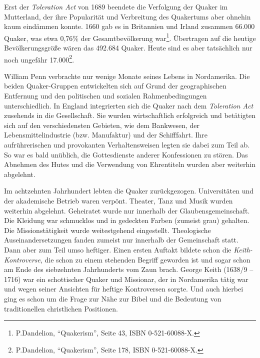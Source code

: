 \medskip

Erst der \textit{Toleration Act} von 1689 beendete die
Verfolgung der Quaker im
Mutterland, der ihre Popularität und Verbreitung des Quakertums aber ohnehin
kaum eindämmen konnte.
 1660 gab
es in Britannien und Irland
zusammen
66.000 Quaker, was etwa 0,76\% der
Gesamtbevölkerung war\footnote{P.Dandelion, "`Quakerism"', Seite 43, ISBN
0-521-60088-X.}. Übertragen auf die heutige Bevölkerungsgröße wären das 492.684
Quaker. Heute sind es aber tatsächlich nur noch ungefähr
17.000\footnote{P.Dandelion, "`Quakerism"', Seite 178, ISBN 0-521-60088-X.}.

\medskip

William Penn verbrachte nur wenige Monate seines Lebens in Nordamerika. Die beiden
Quaker-Gruppen entwickelten sich auf Grund der geographischen Entfernung und den
politischen und sozialen Rahmenbedingungen unterschiedlich. In
England integrierten sich die Quaker nach dem \textit{Toleration Act} zusehends
in die Gesellschaft. Sie wurden wirtschaftlich
erfolgreich und betätigten sich
auf den verschiedensten Gebieten, wie dem Bankwesen, der
Lebensmittelindustrie
(bzw. Manufaktur) und der Schifffahrt. Ihre aufrührerischen und provokanten
Verhaltensweisen legten sie dabei zum Teil ab. So war es bald unüblich, die
Gottesdienste anderer Konfessionen
 zu stören. Das Abnehmen des Hutes und die
Verwendung von Ehrentiteln wurden aber weiterhin abgelehnt.

\medskip

Im achtzehnten Jahrhundert lebten die Quaker zurückgezogen.
Universitäten und der akademische Betrieb waren verpönt.
 Theater, Tanz und Musik
wurden weiterhin abgelehnt. Geheiratet wurde nur innerhalb der
Glaubensgemeinschaft. Die Kleidung war schmucklos und in
gedeckten Farben
(zumeist grau) gehalten. Die Missionstätigkeit wurde weitestgehend eingestellt.
Theologische Auseinandersetzungen fanden zumeist nur innerhalb der Gemeinschaft
statt. Dann aber zum Teil umso heftiger. Einen ersten Auftakt bildete schon die
\textit{Keith-Kontroverse}, die schon zu einem
stehenden Begriff geworden ist und sogar schon am Ende des siebzehnten Jahrhunderts
vom Zaun brach. George Keith (1638/9 -- 1716)
war ein schottischer
Quaker und Missionar, der in
Nordamerika tätig war und wegen seiner Ansichten für heftige Kontroversen
sorgte. Und auch hierbei ging es schon um die Frage zur Nähe zur Bibel und die
Bedeutung von traditionellen christlichen Positionen.

